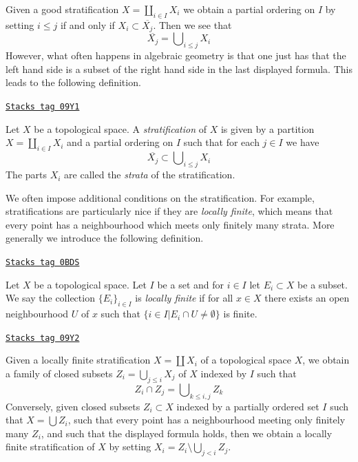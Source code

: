 Given a good stratification $X = \coprod_{i \in I} X_i$ we obtain
a partial ordering on $I$ by setting $i \leq j$ if and only if
$X_i \subset \overline{X_j}$. Then we see that
$$
\overline{X_j} = \bigcup\nolimits_{i \leq j} X_i
$$
However, what often happens in algebraic geometry is that one just
has that the left hand side is a subset of the right hand side in
the last displayed formula. This leads to the following definition.

\begin{definition}[Stratification]
\label{topology-definition-stratification}
\href{https://stacks.math.columbia.edu/tag/09Y1}{\texttt{Stacks tag 09Y1}}

Let $X$ be a topological space. A {\it stratification} of $X$ is
given by a partition $X = \coprod_{i \in I} X_i$ and a partial ordering
on $I$ such that for each $j \in I$ we have
$$
\overline{X_j} \subset \bigcup\nolimits_{i \leq j} X_i
$$
The parts $X_i$ are called the {\it strata} of the stratification.
\end{definition}

We often impose additional conditions on the stratification.
For example, stratifications are particularly nice if they
are {\it locally finite}, which means that every point has a
neighbourhood which meets only finitely many strata. More generally
we introduce the following definition.

\begin{definition}
\label{topology-definition-locally-finite}
\href{https://stacks.math.columbia.edu/tag/0BDS}{\texttt{Stacks tag 0BDS}}

Let $X$ be a topological space. Let $I$ be a set and for $i \in I$
let $E_i \subset X$ be a subset. We say the collection $\{E_i\}_{i \in I}$
is {\it locally finite} if for all $x \in X$ there exists an open
neighbourhood $U$ of $x$ such that
$\{i \in I | E_i \cap U \not = \emptyset\}$ is finite.
\end{definition}


\begin{remark}
\label{topology-remark-locally-finite-stratification}
\href{https://stacks.math.columbia.edu/tag/09Y2}{\texttt{Stacks tag 09Y2}}

Given a locally finite stratification $X = \coprod X_i$ of a
topological space $X$, we obtain a family of closed subsets
$Z_i = \bigcup_{j \leq i} X_j$ of $X$ indexed by $I$ such that
$$
Z_i \cap Z_j = \bigcup\nolimits_{k \leq i, j} Z_k
$$
Conversely, given closed subsets $Z_i \subset X$ indexed by a
partially ordered set $I$ such that $X = \bigcup Z_i$, such that every point
has a neighbourhood meeting only finitely many $Z_i$, and such that
the displayed formula holds, then we obtain a locally finite
stratification of $X$ by setting $X_i = Z_i \setminus \bigcup_{j < i} Z_j$.
\end{remark}


